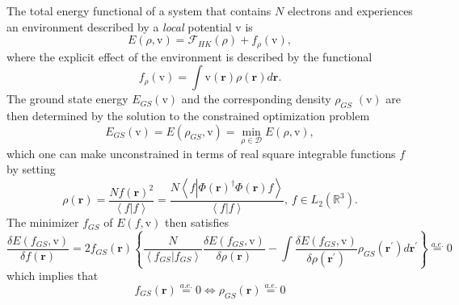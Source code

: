 \documentclass[aps,preprint]{revtex4}%
\begin{document}
The total energy functional of a system that contains $N$ electrons and
experiences an environment described by a \emph{local} potential $\mathrm{v}$
is
\begin{equation}
E\left(  \rho\boldsymbol{,}\mathrm{v}\right)  =\mathcal{F}_{HK}\left(
\rho\right)  +f_{\rho}\left(  \mathrm{v}\right)  ,
\end{equation}
where the explicit effect of the environment is described by the functional
\begin{equation}
f_{\rho}\left(  \mathrm{v}\right)  =\int\mathrm{v}\left(  \boldsymbol{r}%
\right)  \rho\left(  \boldsymbol{r}\right)  d\boldsymbol{r.}%
\end{equation}
The ground state energy $E_{GS}\left(  \mathrm{v}\right)  $ and the
corresponding density $\rho_{GS}$ $\left(  \mathrm{v}\right)  $ are then
determined by the solution to the constrained optimization problem
\begin{equation}
E_{GS}\left(  \mathrm{v}\right)  =E\left(  \rho_{GS}\boldsymbol{,}%
\mathrm{v}\right)  =\min_{\rho\in\mathcal{D}}E\left(  \rho\boldsymbol{,}%
\mathrm{v}\right)  , \label{GS}%
\end{equation}
which one can make unconstrained in terms of real square integrable functions
$f$ by setting
\begin{equation}
\rho\left(  \boldsymbol{r}\right)  =\frac{Nf\left(  \boldsymbol{r}\right)
^{2}}{\left\langle f|f\right\rangle }=\frac{N\left\langle f\left\vert
\Phi\left(  \boldsymbol{r}\right)  ^{\dagger}\Phi\left(  \boldsymbol{r}%
\right)  f\right.  \right\rangle }{\left\langle f|f\right\rangle },\,f\in
L_{2}\left(  \mathbb{R}^{3}\right)  . \label{rho_f}%
\end{equation}
The minimizer $f_{GS}$ of $E\left(  f\boldsymbol{,}\mathrm{v}\right)  $ then
satisfies
\begin{equation}
\frac{\delta E\left(  f_{GS}\boldsymbol{,}\mathrm{v}\right)  }{\delta f\left(
\boldsymbol{r}\right)  }=2f_{GS}\left(  \boldsymbol{r}\right)  \left\{
\frac{N}{\left\langle f_{GS}|f_{GS}\right\rangle }\frac{\delta E\left(
f_{GS}\boldsymbol{,}\mathrm{v}\right)  }{\delta\rho\left(  \boldsymbol{r}%
\right)  }-\int\frac{\delta E\left(  f_{GS}\boldsymbol{,}\mathrm{v}\right)
}{\delta\rho\left(  \boldsymbol{r}^{\prime}\right)  }\rho_{GS}\left(
\boldsymbol{r}^{\prime}\right)  d\boldsymbol{r}^{\prime}\right\}
\overset{a.e.}{=}0
\end{equation}
which implies that
\begin{equation}
f_{GS}\left(  \boldsymbol{r}\right)  \overset{a.e.}{=}0\Leftrightarrow
\rho_{GS}\left(  \boldsymbol{r}\right)  \overset{a.e.}{=}0
\end{equation}
\end{document}
